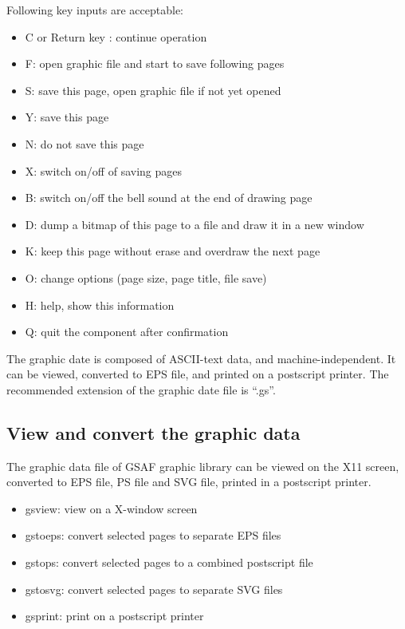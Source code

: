 \documentclass[11pt]{article}
\begin{document}
Following key inputs are acceptable:
\begin{itemize}
\item[] C or Return key : continue operation
\item[] F: open graphic file and start to save following pages
\item[] S: save this page, open graphic file if not yet opened
\item[] Y: save this page
\item[] N: do not save this page
\item[] X: switch on/off of saving pages
\item[] B: switch on/off the bell sound at the end of drawing page
\item[] D: dump a bitmap of this page to a file and draw it in a new window
\item[] K: keep this page without erase and overdraw the next page
\item[] O: change options (page size, page title, file save)
\item[] H: help, show this information
\item[] Q: quit the component after confirmation
\end{itemize}

The graphic date is composed of ASCII-text data, and
machine-independent.  It can be viewed, converted to EPS file, and
printed on a postscript printer.  The recommended extension of the
graphic date file is ``.gs''.

\subsection{View and convert the graphic data}

The graphic data file of GSAF graphic library can be viewed on the X11
screen, converted to EPS file, PS file and SVG file, printed in a
postscript printer.

\begin{itemize}
\item[] gsview: view on a X-window screen
\item[] gstoeps: convert selected pages to separate EPS files
\item[] gstops: convert selected pages to a combined postscript file
\item[] gstosvg: convert selected pages to separate SVG files
\item[] gsprint: print on a postscript printer
\end{itemize}
\end{document}
